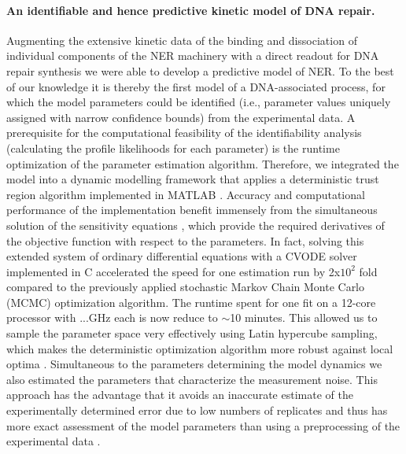\paragraph{An identifiable and hence predictive kinetic model of DNA repair.}
Augmenting the extensive kinetic data of the binding and dissociation of individual components of the NER machinery \cite{Luijsterburg2010} with a direct readout for DNA repair synthesis we were able to develop a predictive model of NER. To the best of our knowledge it is thereby the first model of a DNA-associated process, for which the model parameters could be identified (i.e., parameter values uniquely assigned with narrow confidence bounds) from the experimental data. A prerequisite for the computational feasibility of the identifiability analysis (calculating the profile likelihoods for each parameter) is the runtime optimization of the parameter estimation algorithm. Therefore, we integrated the model into a dynamic modelling framework that applies a deterministic trust region algorithm implemented in MATLAB \cite{Raue2009}. Accuracy and computational performance of the implementation benefit immensely from the simultaneous solution of the sensitivity equations \cite{conn2009introduction,Ramachandran2010,Raue2013}, which provide the required derivatives of the objective function with respect to the parameters. In fact, solving this extended system of ordinary differential equations with a CVODE solver implemented in C accelerated the speed for one estimation run by 2x$\text{10}^\text{2}$ fold compared to the previously applied stochastic Markov Chain Monte Carlo (MCMC) optimization algorithm. The runtime spent for one fit on a 12-core processor with ...GHz each is now reduce to $\sim$10 minutes. This allowed us to sample the parameter space very effectively using Latin hypercube sampling, which makes the deterministic optimization algorithm more robust against local optima \cite{Raue2013}. Simultaneous to the parameters determining the model dynamics we also estimated the parameters that characterize the measurement noise. This approach has the advantage that it avoids an inaccurate estimate of the experimentally determined error due to low numbers of replicates and thus has more exact assessment of the model parameters than using a preprocessing of the experimental data \cite{Raue2013}. \\
